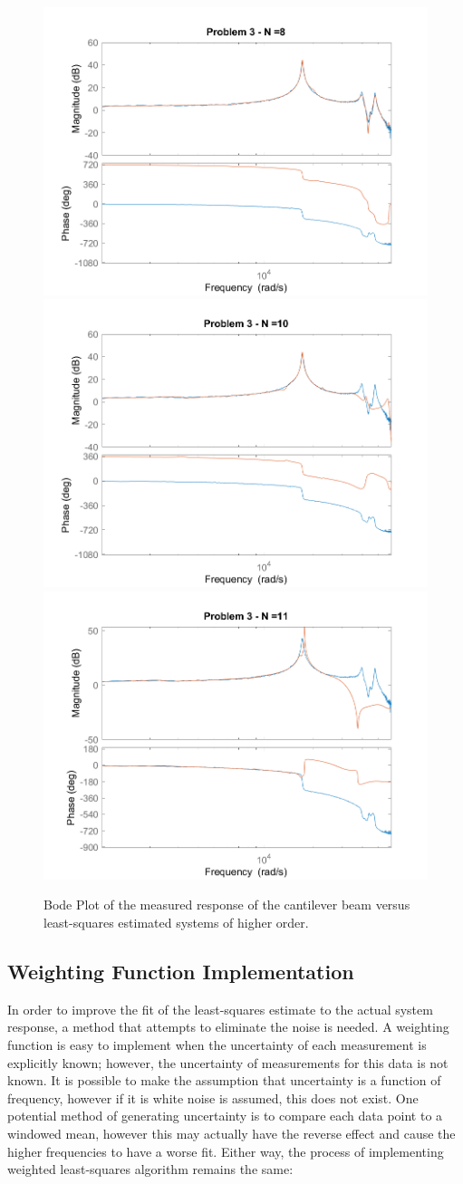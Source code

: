 \documentclass[]{article}
\begin{document}
	
		\begin{figure}
			\centering
			\includegraphics[width=0.6\linewidth]{fig/MECH6325_CA1_pblm3_n=8}
			\includegraphics[width=0.6\linewidth]{fig/MECH6325_CA1_pblm3_n=10}
			\includegraphics[width=0.6\linewidth]{fig/MECH6325_CA1_pblm3_n=11}
			\caption{Bode Plot of the measured response of the cantilever beam versus least-squares estimated systems of higher order.}
			\label{fig:pblm3_n=81011}
		\end{figure}
	
	\newpage
	\subsection{Weighting Function Implementation}
		In order to improve the fit of the least-squares estimate to the actual system response, a method that attempts to eliminate the noise is needed. A weighting function is easy to implement when the uncertainty of each measurement is explicitly known; however, the uncertainty of measurements for this data is not known. It is possible to make the assumption that uncertainty is a function of frequency, however if it is white noise is assumed, this does not exist. One potential method of generating uncertainty is to compare each data point to a windowed mean, however this may actually have the reverse effect and cause the higher frequencies to have a worse fit. Either way, the process of implementing weighted least-squares algorithm remains the same:
		
\end{document}
